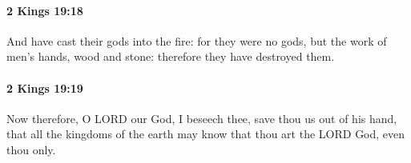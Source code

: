 		\paragraph{2 Kings 19:18} %
			\label{2KINGS-19-18}

			And have cast their gods into the fire: for they were no gods, but the work of men’s hands, wood and stone: therefore they have destroyed them.


		\paragraph{2 Kings 19:19} %
			\label{2KINGS-19-19}

			Now therefore, O LORD our God, I beseech thee, save thou us out of his hand, that all the kingdoms of the earth may know that thou art the LORD God, even thou only.


